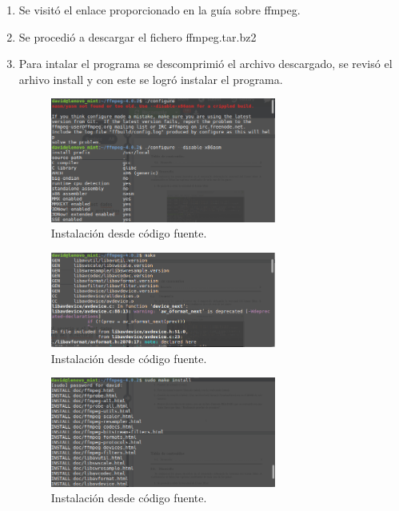 \documentclass[11pt]{article}
\begin{document}
\begin{enumerate}

 \item Se visitó el enlace proporcionado en la guía sobre ffmpeg.
 
 \item Se procedió a descargar el fichero ffmpeg.tar.bz2
 
 \item Para intalar el programa se descomprimió el archivo descargado, se revisó el arhivo install y con este se logró instalar el programa.

\begin{figure}[H]
  \centering
    \includegraphics[width=0.7\textwidth]{img/30}
  \caption{Instalación desde código fuente.}
\end{figure}

\begin{figure}[H]
  \centering
    \includegraphics[width=0.7\textwidth]{img/31}
  \caption{Instalación desde código fuente.}
\end{figure}

\begin{figure}[H]
  \centering
    \includegraphics[width=0.7\textwidth]{img/32}
  \caption{Instalación desde código fuente.}
\end{figure}

\end{enumerate}

\newpage


\end{document}

